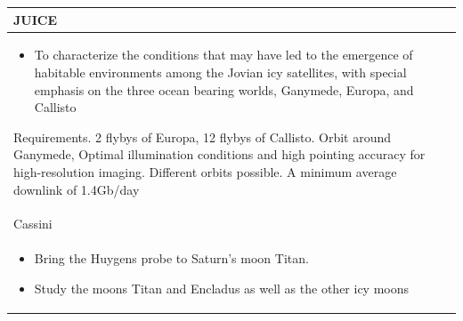 \begin{longtable}{p{}}
  JUICE \\* \midrule

  \begin{itemize}
  \item To characterize the conditions that may have led to the
    emergence of habitable environments among the Jovian icy
    satellites, with special emphasis on the three ocean bearing
    worlds, Ganymede, Europa, and Callisto
  \end{itemize}

  Requirements. 2 flybys of Europa, 12 flybys of Callisto. Orbit
  around Ganymede, Optimal illumination conditions and high pointing
  accuracy for high-resolution imaging. Different orbits possible. A
  minimum average downlink of 1.4Gb/day \\

  Cassini \\* \midrule

  \begin{itemize}
  \item Bring the Huygens probe to Saturn’s moon Titan.
  \item Study the moons Titan and Encladus as well as the other icy
    moons
  \end{itemize} \\ \bottomrule
\end{longtable}


